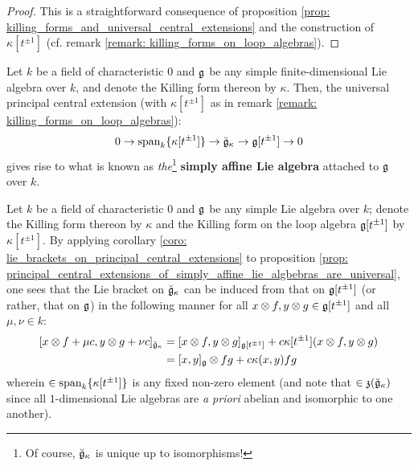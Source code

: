                \begin{proof}
                    This is a straightforward consequence of proposition \ref{prop: killing_forms_and_universal_central_extensions} and the construction of $\kappa[t^{\pm 1}]$ (cf. remark \ref{remark: killing_forms_on_loop_algebras}).
                \end{proof}
            \begin{definition} \label{def: simply_affine_lie_algebras}
                Let $k$ be a field of characteristic $0$ and $\mathfrak{g}$ be any simple finite-dimensional Lie algebra over $k$, and denote the Killing form thereon by $\kappa$. Then, the universal principal central extension (with $\kappa[t^{\pm 1}]$ as in remark \ref{remark: killing_forms_on_loop_algebras}):
                    $$0 \to \operatorname{span}_k \{\kappa[t^{\pm 1}]\} \to \breve{\mathfrak{g}}_{\kappa} \to \mathfrak{g}[t^{\pm 1}] \to 0$$
                gives rise to what is known as \textit{the}\footnote{Of course, $\breve{\mathfrak{g}}_{\kappa}$ is unique up to isomorphisms!} \textbf{simply affine Lie algebra} attached to $\mathfrak{g}$ over $k$.
            \end{definition}
            \begin{remark} \label{remark: lie_brackets_on_simply_affine_lie_algebras}
                Let $k$ be a field of characteristic $0$ and $\mathfrak{g}$ be any simple Lie algebra over $k$; denote the Killing form thereon by $\kappa$ and the Killing form on the loop algebra $\mathfrak{g}[t^{\pm 1}]$ by $\kappa[t^{\pm 1}]$. By applying corollary \ref{coro: lie_brackets_on_principal_central_extensions} to proposition \ref{prop: principal_central_extensions_of_simply_affine_lie_algbebras_are_universal}, one sees that the Lie bracket on $\breve{\mathfrak{g}}_{\kappa}$ can be induced from that on $\mathfrak{g}[t^{\pm 1}]$ (or rather, that on $\mathfrak{g}$) in the following manner for all $x \tensor f, y \tensor g \in \g[t^{\pm 1}]$ and all $\mu, \nu \in k$:
                    $$
                        \begin{aligned}
                            [x \tensor f + \mu c, y \tensor g + \nu c]_{\breve{\g}_{\kappa}} & = [x \tensor f, y \tensor g]_{\g[t^{\pm 1}]} + c \kappa[t^{\pm 1}](x \tensor f, y \tensor g)
                            \\
                            & = [x, y]_{\g} \tensor fg + c \kappa(x, y) fg
                        \end{aligned}
                    $$
                wherein $ \in \operatorname{span}_k \{\kappa[t^{\pm 1}]\}$ is any fixed non-zero element (and note that $ \in \mathfrak{z}(\breve{\mathfrak{g}}_{\kappa})$ since all $1$-dimensional Lie algebras are \textit{a priori} abelian and isomorphic to one another). 
            \end{remark}
